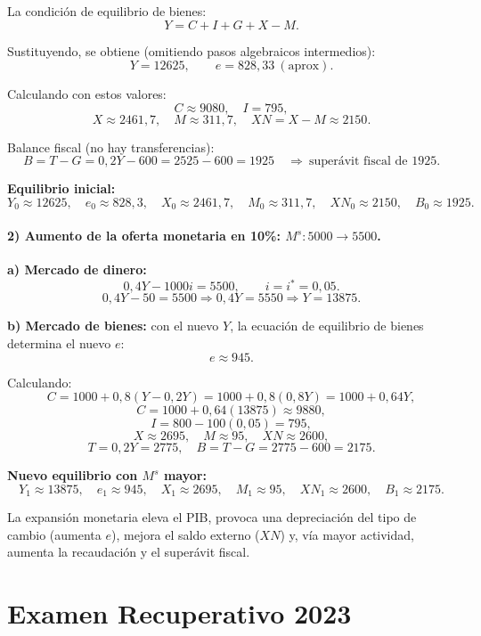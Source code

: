 \documentclass[11pt,addpoints]{article}
\begin{document}
La condición de equilibrio de bienes:
\[
Y = C + I + G + X - M.
\]

Sustituyendo, se obtiene (omitiendo pasos algebraicos intermedios):
\[
Y = 12625,\qquad e = 828{,}33\ (\text{aprox}).
\]

Calculando con estos valores:
\[
C \approx 9080,\quad I = 795,
\]
\[
X \approx 2461{,}7,\quad M \approx 311{,}7,\quad XN = X - M \approx 2150.
\]

Balance fiscal (no hay transferencias):
\[
B = T - G = 0{,}2Y - 600 = 2525 - 600 = 1925\quad
\Rightarrow\ \text{superávit fiscal de }1925.
\]

\medskip
\textbf{Equilibrio inicial:}
\[
Y_0 \approx 12625,\quad e_0 \approx 828{,}3,\quad X_0 \approx 2461{,}7,\quad M_0 \approx 311{,}7,\quad XN_0 \approx 2150,\quad B_0 \approx 1925.
\]


\paragraph{2) Aumento de la oferta monetaria en 10\%: $M^s: 5000 \to 5500$.}

\textbf{a) Mercado de dinero:}
\[
0{,}4Y - 1000i = 5500,\qquad i = i^* = 0{,}05.
\]
\[
0{,}4Y - 50 = 5500 \Rightarrow 0{,}4Y = 5550 \Rightarrow Y = 13875.
\]

\textbf{b) Mercado de bienes:} con el nuevo $Y$, la ecuación de equilibrio de bienes determina el nuevo $e$:
\[
e \approx 945.
\]

Calculando:
\[
C = 1000 + 0{,}8(Y - 0{,}2Y) = 1000 + 0{,}8(0{,}8Y) = 1000 + 0{,}64Y,
\]
\[
C = 1000 + 0{,}64(13875) \approx 9880,
\]
\[
I = 800 - 100(0{,}05) = 795,
\]
\[
X \approx 2695,\quad M \approx 95,\quad XN \approx 2600,
\]
\[
T = 0{,}2Y = 2775,\quad B = T - G = 2775 - 600 = 2175.
\]

\medskip
\textbf{Nuevo equilibrio con $M^s$ mayor:}
\[
Y_1 \approx 13875,\quad e_1 \approx 945,\quad X_1 \approx 2695,\quad M_1 \approx 95,\quad XN_1 \approx 2600,\quad B_1 \approx 2175.
\]

La expansión monetaria eleva el PIB, provoca una depreciación del tipo de cambio (aumenta $e$), mejora el saldo externo ($XN$) y, vía mayor actividad, aumenta la recaudación y el superávit fiscal.

\newpage
\vspace*{0.1cm}
\section*{Examen Recuperativo 2023}
\end{document}
